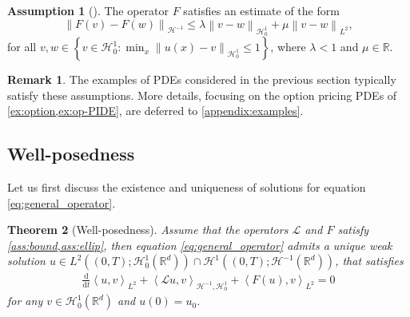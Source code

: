 \documentclass[11pt,a4paper,reqno]{amsart}
\numberwithin{equation}{section}
\theoremstyle{plain}
\newtheorem{theorem}{Theorem}[section]
\theoremstyle{definition}
\newtheorem{remark}[theorem]{Remark}
\newtheorem{assumption}{Assumption}
\newenvironment{namedassumption}[2][]
  {\renewcommand\theassumption{#2}\begin{assumption}[#1]}
  {\end{assumption}}
\def\ud{\mathrm d}
\newcommand{\ip}[1]{\left\langle#1\right\rangle}
\newcommand{\cL}{\mathcal{L}}
\newcommand{\cH}{\mathcal{H}}
\newcommand{\R}{\mathbb{R}}
\newcommand{\norm}[1]{\left\|#1 \right\|} %
\begin{document}
\begin{namedassumption}{(LIP)}
\label{ass:Lip}
The operator $F$ satisfies an estimate of the form 
\[
\norm{F(v) - F(w)}_{\mathcal{H}^{-1}} \le \lambda \norm{v - w}_{\mathcal{H}^1_0} + \mu \norm{v - w}_{L^2}, 
\]
for all $v,w \in \left\{ v \in \mathcal{H}_0^1: \min_x \norm{u(x) - v}_{\mathcal{H}^1_0} \leq 1 \right\}$, where $\lambda<1$ and $\mu\in\R$.
\end{namedassumption}

\begin{remark}
The examples of PDEs considered in the previous section typically satisfy these assumptions. 
More details, focusing on the option pricing PDEs of \cref{ex:option,ex:op-PIDE}, are deferred to \cref{appendix:examples}.
\end{remark}


\subsection{Well-posedness}
\label{sec:well}

Let us first discuss the existence and uniqueness of solutions for equation \eqref{eq:general_operator}.

\begin{theorem}[Well-posedness]
Assume that the operators $\cL$ and $F$ satisfy \cref{ass:bound,ass:ellip}, then equation \eqref{eq:general_operator} admits a unique weak solution $u \in L^2 \left( \left( 0, T \right) ; \cH_0^1 (\R^d) \right) \cap \cH^1 \left( \left( 0, T \right) ; \cH^{-1} (\R^d) \right)$, that satisfies
\begin{align*}
\frac{\ud}{\ud t}\ip{u, v}_{L^2} + \ip{\cL  u,  v}_{\cH^{-1},\cH_0^1}  + \ip{F(u), v}_{L^2} = 0
\end{align*}
for any $v \in \cH_0^1 (\R^d)$ and $u \left( 0 \right) = u_0$. 
\end{theorem}
\end{document}

